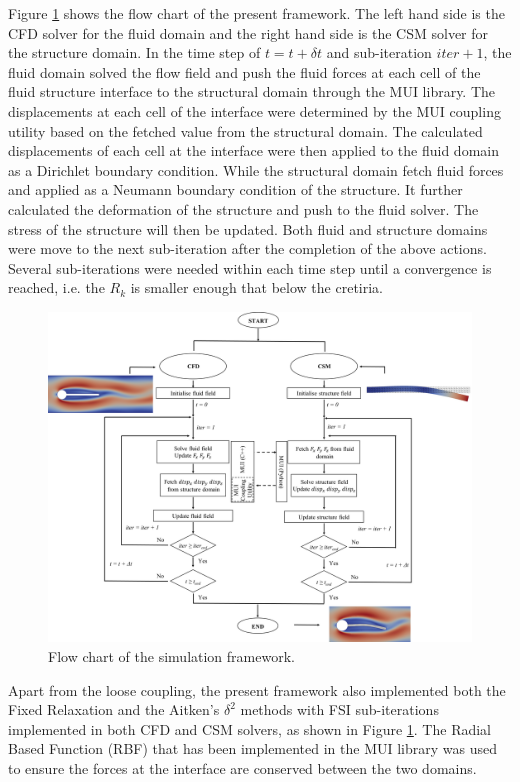 \documentclass[a4paper, 12pt]{article}
\begin{document}
Figure \ref{fig:FSI_flow_chart} shows the flow chart of the present framework. The left hand side is the CFD solver for the fluid domain and the right hand side is the CSM solver for the structure domain. In the time step of $t=t+\delta t$ and sub-iteration $iter + 1$, the fluid domain solved the flow field and push the fluid forces at each cell of the fluid structure interface to the structural domain through the MUI library. The displacements at each cell of the interface were determined by the MUI coupling utility based on the fetched value from the structural domain. The calculated displacements of each cell at the interface were then applied to the fluid domain as a Dirichlet boundary condition. While the structural domain fetch fluid forces and applied as a Neumann boundary condition of the structure. It further calculated the deformation of the structure and push to the fluid solver. The stress of the structure will then be updated. Both fluid and structure domains were move to the next sub-iteration after the completion of the above actions. Several sub-iterations were needed within each time step until a convergence is reached, i.e. the $R_k$ is smaller enough that below the cretiria.

\begin{figure}
	\centering
	\includegraphics[width=1\columnwidth]{PICS/FSI_flow_chart.png}
	\caption{Flow chart of the simulation framework.}\label{fig:FSI_flow_chart}
\end{figure}

Apart from the loose coupling, the present framework also implemented both the Fixed Relaxation and the Aitken's $\delta^2$ methods with FSI sub-iterations implemented in both CFD and CSM solvers, as shown in Figure \ref{fig:FSI_flow_chart}. The Radial Based Function (RBF) that has been implemented in the MUI library was used to ensure the forces at the interface are conserved between the two domains. 
\end{document}
